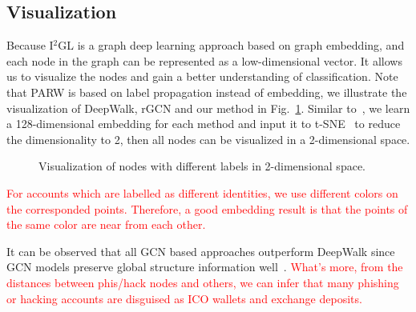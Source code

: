\subsection{Visualization}
Because I$^2$GL is a graph deep learning approach based on graph embedding, and each node in the graph can be represented as a low-dimensional vector. It allows us to visualize the nodes and gain a better understanding of classification. Note that PARW is based on label propagation instead of embedding, we illustrate the visualization of DeepWalk, rGCN and our method in Fig.~\ref{fig:visualization}. Similar to~\cite{wang2016structural}, we learn a 128-dimensional embedding for each method and input it to t-SNE~\cite{maaten2008visualizing} to reduce the dimensionality to 2, then all nodes can be visualized in a 2-dimensional space.

\begin{figure}
\centering     %
{}
\caption{Visualization of nodes with different labels in 2-dimensional space.}
\label{fig:visualization}
\end{figure}

\textcolor{red}{For accounts which are labelled as different identities, we use different colors on the corresponded points. Therefore, a good embedding result is that the points of the same color are near from each other.}

It can be observed that all GCN based approaches outperform DeepWalk since GCN models preserve global structure information well~\cite{goyal2018graph}. \textcolor{red}{What’s more, from the distances between phis/hack nodes and others, we can infer that many phishing or hacking accounts are disguised as ICO wallets and exchange deposits.}

